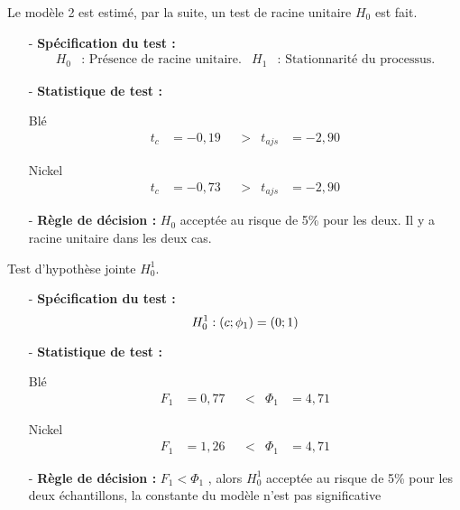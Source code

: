     Le modèle 2 est estimé, par la suite, un test de racine unitaire $H_{0}$ est fait.
    \begin{itemize}
    \item[-]\textbf{Spécification du test :} 
    \begin{align*}
        H_{0} &: \text{ Présence de racine unitaire.} & H_{1} &: \text{ Stationnarité du processus.}
    \end{align*}
    \item[-]\textbf{Statistique de test :} 
    \begin{multicols}{2}
    \centering Blé
    \begin{align*}
            t_{c} &= -0,19  & &> & t_{ajs} &= -2,90
    \end{align*}

    \columnbreak

    \centering Nickel
    \begin{align*}
        t_{c} &= -0,73  & &> & t_{ajs} &= -2,90
    \end{align*}
    \end{multicols}
    \item[-]\textbf{Règle de décision :} $H_{0}$ acceptée au risque de 5\% pour les deux. Il y a racine unitaire dans les deux cas.
    \end{itemize}
    Test d'hypothèse jointe $H_{0}^{1}$.
    \begin{itemize}
    \item[-]\textbf{Spécification du test :} 
    \begin{equation*}
            H_{0}^{1} : (c; \phi_{1}) = (0;1)\\
    \end{equation*}
    \item[-]\textbf{Statistique de test :}
    \begin{multicols}{2}
        \centering Blé
        \begin{align*}
            F_{1} &= 0,77 & &< & \Phi_{1} &= 4,71
        \end{align*}
    
        \columnbreak
    
        \centering Nickel
        \begin{align*}
            F_{1} &= 1,26 & &< & \Phi_{1} &= 4,71
        \end{align*}
    \end{multicols}  
    \item[-]\textbf{Règle de décision :}  $F_{1} < \Phi_{1}$ , alors $H_{0}^{1}$ acceptée au risque de 5\% pour les deux échantillons, la constante du modèle n'est pas
    significative
    \end{itemize}
